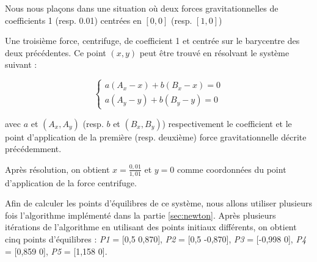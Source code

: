 Nous nous plaçons dans une situation où deux forces gravitationnelles de coefficients 1 (resp. 0.01) centrées en $[0, 0]$ (resp. $[1, 0]$)

Une troisième force, centrifuge, de coefficient 1 et centrée sur le barycentre des deux précédentes. Ce point $(x, y)$ peut être trouvé en résolvant le système suivant :

$$
\begin{cases}
  a(A_x - x) + b(B_x - x) = 0 \\
  a(A_y - y) + b(B_y - y) = 0
\end{cases}
$$

avec $a$ et $(A_x, A_y)$ (resp. $b$ et $(B_x, B_y)$) respectivement le coefficient et le point d'application de la première (resp. deuxième) force gravitationnelle décrite précédemment.

Après résolution, on obtient $x = \frac{0,01}{1,01}$ et $y = 0$ comme coordonnées du point d'application de la force centrifuge.

\bigskip

Afin de calculer les points d'équilibres de ce système, nous allons utiliser plusieurs fois l'algorithme implémenté dans la partie \ref{sec:newton}. Après plusieurs itérations de l'algorithme en utilisant des points initiaux différents, on obtient cinq points d'équilibres : \emph{P1} = [0,5  0,870], \emph{P2} = [0,5  -0,870], \emph{P3} = [-0,998  0], \emph{P4} = [0,859  0], \emph{P5} = [1,158  0].
